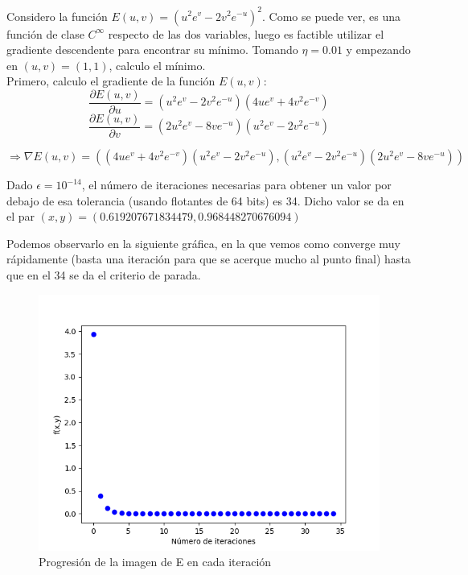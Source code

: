 Considero la función $E(u,v) = (u^2e^v-2v^2e^{-u})^2$. Como se puede ver, es una función de clase $C^{\infty}$ respecto de las dos variables, luego es factible utilizar el gradiente descendente para encontrar su mínimo. Tomando $\eta=0.01$ y empezando en $(u,v)=(1,1)$, calculo el mínimo. \\

Primero, calculo el gradiente de la función $E(u,v)$:
$$\frac{\partial E(u,v)}{\partial u} = (u^2e^v-2v^2e^{-u})(4ue^v+4v^2e^{-v})$$
$$\frac{\partial E(u,v)}{\partial v} = (2u^2e^v-8ve^{-u})(u^2e^v-2v^2e^{-u})$$

$$\Rightarrow \nabla E(u,v) = \left((4ue^v+4v^2e^{-v})(u^2e^v-2v^2e^{-u}),(u^2e^v-2v^2e^{-u})(2u^2e^v-8ve^{-u})\right)$$

Dado $\epsilon = 10^{-14}$, el número de iteraciones necesarias para obtener un valor por debajo de esa tolerancia (usando flotantes de 64 bits) es 34. Dicho valor se da en el par $(x,y) = (0.619207671834479,0.968448270676094)$

Podemos observarlo en la siguiente gráfica, en la que vemos como converge muy rápidamente (basta una iteración para que se acerque mucho al punto final) hasta que en el 34 se da el criterio de parada. \\

\begin{figure}[H] %
	\centering
	\includegraphics[scale=0.6]{e1.png}  %
	\caption{Progresión de la imagen de E en cada iteración} 
	\label{fig:e1}
\end{figure}

